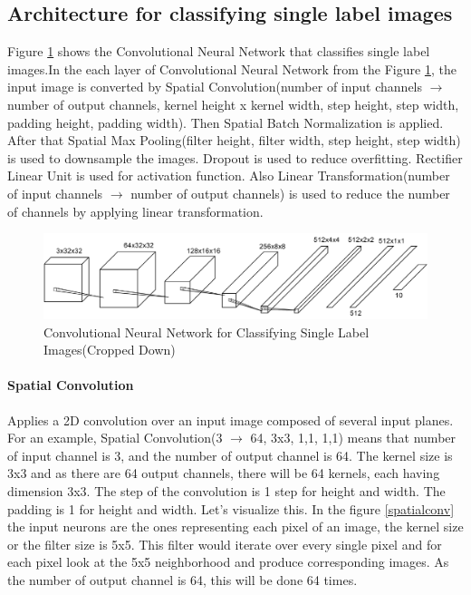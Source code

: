 \subsection{Architecture for classifying single label images}
Figure \ref{singlelabel} shows the Convolutional Neural Network that classifies single label images.In 
the each layer of Convolutional Neural Network from the Figure \ref{singlelabel}, the input image is converted by Spatial Convolution(number of input channels \(\rightarrow\) number of output channels, kernel height x kernel width, step height, step width, padding height, padding width). Then Spatial Batch Normalization is applied. After that Spatial Max Pooling(filter height, filter width, step height, step width) is used to downsample the images. Dropout is used to reduce overfitting. Rectifier Linear Unit is used for activation function. Also Linear Transformation(number of input channels \(\rightarrow\) number of output channels) is used to reduce the number of channels by applying linear transformation.

\begin{figure}[!htb]
  \centering
  \includegraphics[width=.5\textwidth]{images/singlelabel.png}
  \caption{Convolutional Neural Network for Classifying Single Label Images(Cropped Down)}
   \vspace{-.5cm} \label{singlelabel}
\end{figure} 


 \paragraph{Spatial Convolution}
  
  Applies a 2D convolution over an input image composed of several input planes. For an example, Spatial Convolution(3 \(\rightarrow\) 64, 3x3, 1,1, 1,1) means that number of input channel is 3, and the number of output channel is 64. The kernel size is 3x3 and as there are 64 output channels, there will be 64 kernels, each having dimension 3x3. The step of the convolution is 1 step for height and width. The padding is 1 for height and width. Let's visualize this. In the figure \ref{spatialconv} the input neurons are the ones representing each pixel of an image, the kernel size or the filter size is 5x5. This filter would iterate over every single pixel and for each pixel look at the 5x5 neighborhood and produce corresponding images. As the number of output channel is 64, this will be done 64 times.
  
